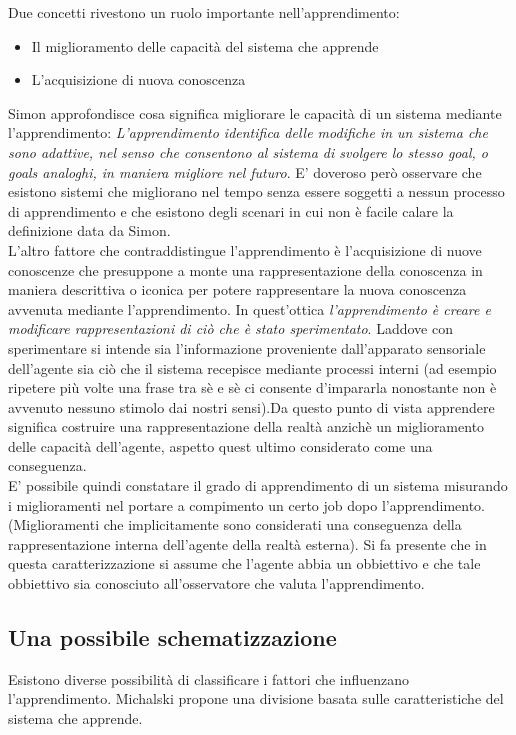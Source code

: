 Due concetti rivestono un ruolo importante nell'apprendimento: 
\begin{itemize}
\item Il miglioramento delle capacità del sistema che apprende
\item L'acquisizione di nuova conoscenza
\end{itemize}
Simon \cite{Sim83} approfondisce cosa significa migliorare le capacità di un sistema mediante l'apprendimento: \textit {L'apprendimento identifica delle modifiche in un sistema che sono adattive, nel senso che consentono al sistema di svolgere lo stesso goal, o goals analoghi, in maniera migliore nel futuro}. E' doveroso però osservare  che esistono sistemi che migliorano nel tempo senza essere soggetti a nessun processo di apprendimento e che esistono degli scenari in cui non è facile calare la definizione data da Simon.\\

L'altro fattore che contraddistingue l'apprendimento è l'acquisizione di nuove conoscenze che presuppone a monte una rappresentazione della conoscenza in maniera descrittiva o iconica per potere rappresentare la nuova conoscenza avvenuta mediante l'apprendimento.  In quest'ottica \emph{l'apprendimento è creare e modificare rappresentazioni di ciò che è stato sperimentato}. Laddove con sperimentare si intende sia l'informazione proveniente dall'apparato sensoriale dell'agente sia ciò che il sistema recepisce mediante processi interni (ad esempio ripetere più volte una frase tra sè e sè ci consente d'impararla nonostante non è avvenuto nessuno stimolo dai nostri sensi).Da questo punto di vista apprendere significa costruire una rappresentazione della realtà anzichè un miglioramento delle capacità dell'agente, aspetto quest ultimo considerato come una conseguenza.\\

E' possibile quindi constatare il grado di apprendimento di un sistema misurando i miglioramenti nel portare a compimento un certo job dopo l'apprendimento. (Miglioramenti che implicitamente sono considerati una conseguenza della rappresentazione interna dell'agente della realtà esterna). Si fa presente che in questa caratterizzazione si assume che l'agente abbia un obbiettivo e che tale obbiettivo sia conosciuto all'osservatore che valuta l'apprendimento. 
\subsection{Una possibile schematizzazione}
Esistono diverse possibilità di classificare i fattori che influenzano l’apprendimento. Michalski \cite{Mic86b} propone una divisione  basata sulle
caratteristiche del sistema che apprende.

